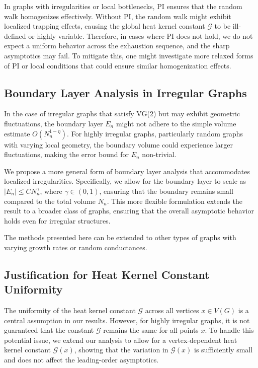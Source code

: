 \documentclass[12pt]{amsart}
\theoremstyle{definition}
\theoremstyle{remark}
\newcommand{\cG}{\mathcal{G}}    %
\begin{document}
In graphs with irregularities or local bottlenecks, PI ensures that the random walk homogenizes effectively. Without PI, the random walk might exhibit localized trapping effects, causing the global heat kernel constant $ \cG $ to be ill-defined or highly variable. Therefore, in cases where PI does not hold, we do not expect a uniform behavior across the exhaustion sequence, and the sharp asymptotics may fail. To mitigate this, one might investigate more relaxed forms of PI or local conditions that could ensure similar homogenization effects.

\subsection{Boundary Layer Analysis in Irregular Graphs}
In the case of irregular graphs that satisfy VG(2) but may exhibit geometric fluctuations, the boundary layer $ E_n $ might not adhere to the simple volume estimate $ O(N_n^{1-\eta}) $. For highly irregular graphs, particularly random graphs with varying local geometry, the boundary volume could experience larger fluctuations, making the error bound for $ E_n $ non-trivial.

We propose a more general form of boundary layer analysis that accommodates localized irregularities. Specifically, we allow for the boundary layer to scale as $ |E_n| \leq C N_n^\gamma $, where $ \gamma \in (0,1) $, ensuring that the boundary remains small compared to the total volume $ N_n $. This more flexible formulation extends the result to a broader class of graphs, ensuring that the overall asymptotic behavior holds even for irregular structures.

The methods presented here can be extended to other types of graphs with varying growth rates or random conductances.

\subsection{Justification for Heat Kernel Constant Uniformity}
The uniformity of the heat kernel constant $ \cG $ across all vertices $ x \in V(G) $ is a central assumption in our results. However, for highly irregular graphs, it is not guaranteed that the constant $ \cG $ remains the same for all points $ x $. To handle this potential issue, we extend our analysis to allow for a vertex-dependent heat kernel constant $ \cG(x) $, showing that the variation in $ \cG(x) $ is sufficiently small and does not affect the leading-order asymptotics.
\end{document}
